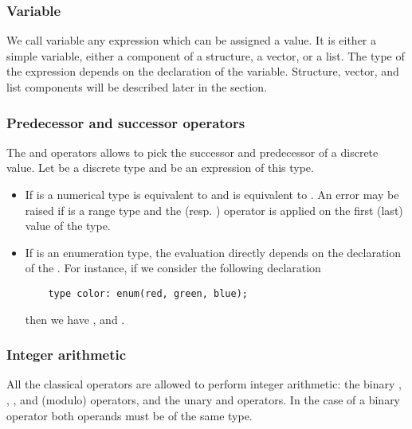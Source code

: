 \constantexpressiondef


\subsubsection{Variable}
We call variable any expression which can be assigned a value.  It is
either a simple variable, either a component of a structure, a vector,
or a list.  The type of the expression depends on the declaration of
the variable.  Structure, vector, and list components will be
described later in the section.\\

\variabledef


\subsubsection{Predecessor and successor operators}
 The  and
 operators allows to pick the successor and predecessor of a
discrete value.  Let  be a discrete type and  be an
expression of this type.
\begin{itemize}
\item
  If  is a numerical type  is equivalent to  and  is equivalent to .  An error may be
  raised if  is a range type and the  (resp. )
  operator is applied on the first (last) value of the type.
\item
  If  is an enumeration type, the evaluation directly depends on
  the declaration of the .  For instance, if we consider the
  following declaration
  \begin{lstlisting}
    type color: enum(red, green, blue);
  \end{lstlisting}
  then we have , and .
\end{itemize}

\predsuccoperationdef


\subsubsection{Integer arithmetic}
All the classical operators are allowed to perform integer arithmetic:
the binary \LS{+}, \LS{-}, \LS{/}, \LS{*} and \LS{\%} (modulo)
operators, and the unary \LS{+} and \LS{-} operators.  In the case of
a binary operator both operands must be of the same type.

